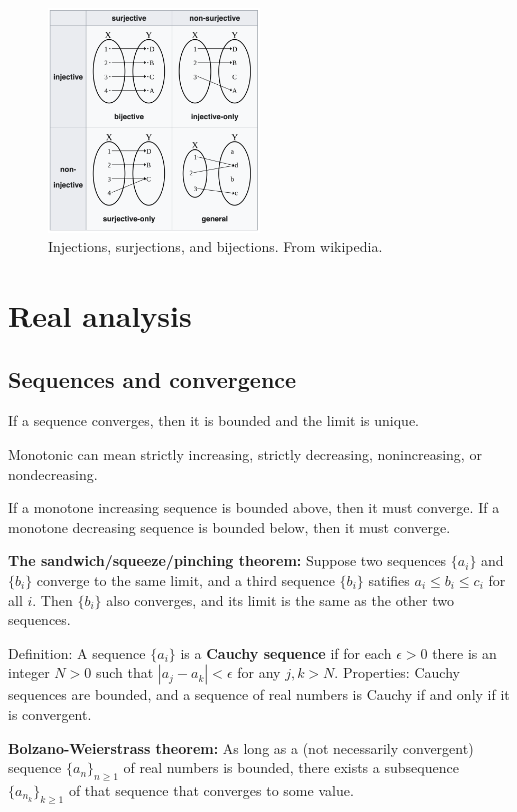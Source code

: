 \documentclass{article}
\begin{document}
\begin{figure}
    \centering
    \includegraphics[width=0.5\textwidth]{figures/injection-surjection-bijection.png}
    \caption{Injections, surjections, and bijections. From wikipedia.}
    \label{fig:bijection}
\end{figure}

\section*{Real analysis}

\subsection*{Sequences and convergence}

If a sequence converges, then it is bounded and the limit is unique.

Monotonic can mean strictly increasing, strictly decreasing, nonincreasing, or nondecreasing.

If a monotone increasing sequence is bounded above, then it must converge. If a monotone decreasing sequence is bounded below, then it must converge.

\large \textbf{The sandwich/squeeze/pinching theorem:} Suppose two sequences $\{a_i\}$ and $\{b_i\}$ converge to the same limit, and a third sequence $\{b_i\}$ satifies $a_i \le b_i \le c_i$ for all $i$. Then $\{b_i\}$ also converges, and its limit is the same as the other two sequences.

Definition: A sequence $\{a_i\}$ is a \textbf{Cauchy sequence} if for each $\epsilon > 0$ there is an integer $N > 0$ such that $|a_j-a_k| < \epsilon$ for any $j,k > N$. Properties: Cauchy sequences are bounded, and a sequence of real numbers is Cauchy if and only if it is convergent.

\large \textbf{Bolzano-Weierstrass theorem:} As long as a (not necessarily convergent) sequence $\{a_n\}_{n\ge 1}$ of real numbers is bounded, there exists a subsequence $\{a_{n_k}\}_{k\ge 1}$ of that sequence that converges to some value.
\end{document}
